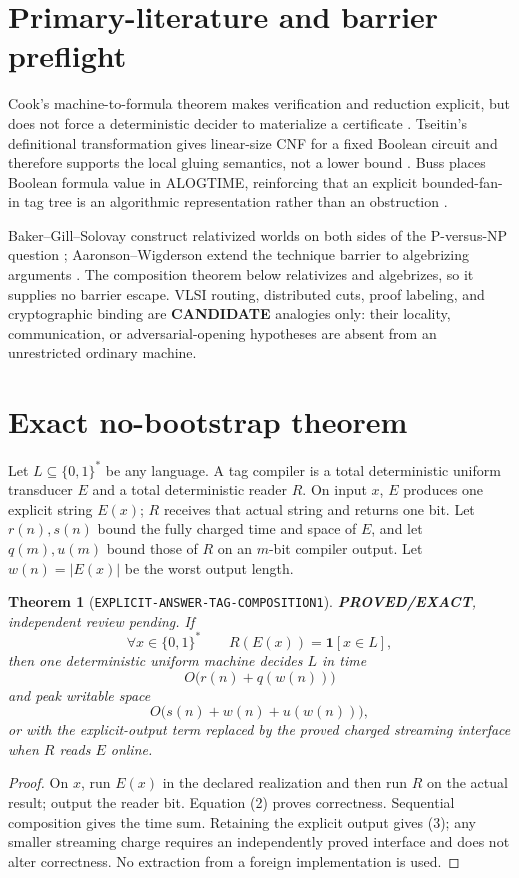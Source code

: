 \documentclass[11pt]{article}
\newtheorem{theorem}{Theorem}
\newcommand{\EXACT}{\textbf{PROVED/EXACT}}
\newcommand{\CAND}{\textbf{CANDIDATE}}
\begin{document}
\section{Primary-literature and barrier preflight}

Cook's machine-to-formula theorem makes verification and reduction explicit,
but does not force a deterministic decider to materialize a certificate
\cite{Cook}.  Tseitin's definitional transformation gives linear-size CNF for
a fixed Boolean circuit and therefore supports the local gluing semantics,
not a lower bound \cite{Tseitin}.  Buss places Boolean formula value in
ALOGTIME, reinforcing that an explicit bounded-fan-in tag tree is an
algorithmic representation rather than an obstruction \cite{Buss}.

Baker--Gill--Solovay construct relativized worlds on both sides of the
P-versus-NP question \cite{BGS}; Aaronson--Wigderson extend the technique
barrier to algebrizing arguments \cite{AW}.  The composition theorem below
relativizes and algebrizes, so it supplies no barrier escape.  VLSI routing,
distributed cuts, proof labeling, and cryptographic binding are
\CAND{} analogies only: their locality, communication, or adversarial-opening
hypotheses are absent from an unrestricted ordinary machine.

\section{Exact no-bootstrap theorem}

Let $L\subseteq\{0,1\}^*$ be any language.  A tag compiler is a total
deterministic uniform transducer $E$ and a total deterministic reader $R$.
On input $x$, $E$ produces one explicit string $E(x)$; $R$ receives that
actual string and returns one bit.  Let $r(n),s(n)$ bound the fully charged
time and space of $E$, and let $q(m),u(m)$ bound those of $R$ on an $m$-bit
compiler output.  Let $w(n)=|E(x)|$ be the worst output length.

\begin{theorem}[\texttt{EXPLICIT-ANSWER-TAG-COMPOSITION1}]
\EXACT, independent review pending.  If
\[
 \forall x\in\{0,1\}^*\qquad R(E(x))=\mathbf 1[x\in L],              \tag{2}
\]
then one deterministic uniform machine decides $L$ in time
\[
 O\bigl(r(n)+q(w(n))\bigr)
\]
and peak writable space
\[
 O\bigl(s(n)+w(n)+u(w(n))\bigr),                                    \tag{3}
\]
or with the explicit-output term replaced by the proved charged streaming
interface when $R$ reads $E$ online.
\end{theorem}
\begin{proof}
On $x$, run $E(x)$ in the declared realization and then run $R$ on the actual
result; output the reader bit.  Equation (2) proves correctness.  Sequential
composition gives the time sum.  Retaining the explicit output gives (3);
any smaller streaming charge requires an independently proved interface and
does not alter correctness.  No extraction from a foreign implementation is
used.
\end{proof}
\end{document}
